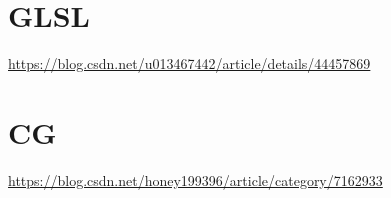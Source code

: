 \documentclass[UTF8,a4paper,12pt]{ctexbook}
\begin{document}
\chapter{GLSL}
	\url{https://blog.csdn.net/u013467442/article/details/44457869}
	
	
	
\chapter{CG}
	\url{https://blog.csdn.net/honey199396/article/category/7162933}































































































	
\end{document}
